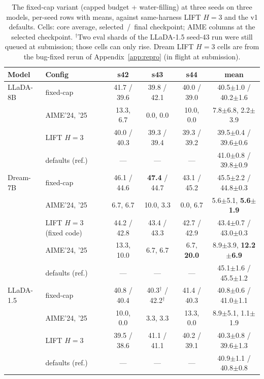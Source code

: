 \documentclass{article} %
\begin{document}
\begin{table}[t]
\caption{The fixed-cap variant (capped budget + water-filling) at three seeds on three models, per-seed rows with means, against same-harness LIFT $H{=}3$ and the v1 defaults. Cells: core average, selected~/~final checkpoint; AIME columns at the selected checkpoint. $^\dagger$Two eval shards of the LLaDA-1.5 seed-43 run were still queued at submission; those cells can only rise. Dream LIFT $H{=}3$ cells are from the bug-fixed rerun of Appendix~\ref{app:repro} (in flight at submission).}
\label{tab:v2champ}
\begin{center}
\begin{tabular}{llcccc}
\toprule
Model & Config & s42 & s43 & s44 & mean \\
\midrule
LLaDA-8B & fixed-cap & 41.7 / 39.6 & 39.8 / 42.1 & 40.0 / 39.0 & 40.5$\pm$1.0 / 40.2$\pm$1.6 \\
         & \quad AIME'24, '25 & 13.3, 6.7 & 0.0, 0.0 & 10.0, 0.0 & 7.8$\pm$6.8, 2.2$\pm$3.9 \\
         & LIFT $H{=}3$ & 40.0 / 40.3 & 39.3 / 39.4 & 39.3 / 39.2 & 39.5$\pm$0.4 / 39.6$\pm$0.6 \\
         & defaults (ref.) & --- & --- & --- & 41.0$\pm$0.8 / 39.8$\pm$0.9 \\
\midrule
Dream-7B & fixed-cap & 46.1 / 44.6 & \textbf{47.4} / 44.7 & 43.1 / 45.2 & 45.5$\pm$2.2 / 44.8$\pm$0.3 \\
         & \quad AIME'24, '25 & 6.7, 6.7 & 10.0, 3.3 & 0.0, 6.7 & 5.6$\pm$5.1, \textbf{5.6$\pm$1.9} \\
         & LIFT $H{=}3$ (fixed code) & 44.2 / 42.8 & 43.4 / 43.3 & 42.7 / 42.9 & 43.4$\pm$0.7 / 43.0$\pm$0.3 \\
         & \quad AIME'24, '25 & 13.3, 10.0 & 6.7, 6.7 & 6.7, \textbf{20.0} & 8.9$\pm$3.9, \textbf{12.2$\pm$6.9} \\
         & defaults (ref.) & --- & --- & --- & 45.1$\pm$1.6 / 45.5$\pm$1.2 \\
\midrule
LLaDA-1.5 & fixed-cap & 40.8 / 40.4 & 40.3$^\dagger$ / 42.2$^\dagger$ & 41.4 / 40.3 & 40.8$\pm$0.6 / 41.0$\pm$1.1 \\
          & \quad AIME'24, '25 & 10.0, 0.0 & 3.3, 3.3 & 13.3, 0.0 & 8.9$\pm$5.1, 1.1$\pm$1.9 \\
          & LIFT $H{=}3$ & 39.5 / 38.6 & 41.1 / 41.1 & 40.2 / 39.1 & 40.3$\pm$0.8 / 39.6$\pm$1.3 \\
          & defaults (ref.) & --- & --- & --- & 40.9$\pm$1.1 / 40.8$\pm$0.8 \\
\bottomrule
\end{tabular}
\end{center}
\end{table}
\end{document}
